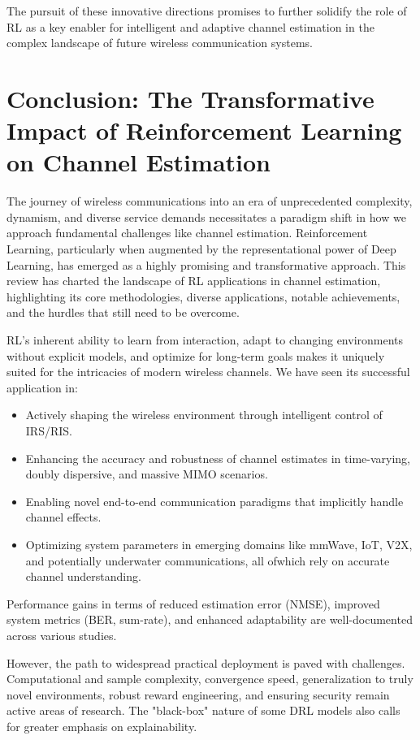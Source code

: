 \documentclass[journal,twocolumn]{IEEEtran}
\begin{document}
The pursuit of these innovative directions promises to further solidify the role of RL as a key enabler for intelligent and adaptive channel estimation in the complex landscape of future wireless communication systems.

\section{Conclusion: The Transformative Impact of Reinforcement Learning on Channel Estimation}
The journey of wireless communications into an era of unprecedented complexity, dynamism, and diverse service demands necessitates a paradigm shift in how we approach fundamental challenges like channel estimation. Reinforcement Learning, particularly when augmented by the representational power of Deep Learning, has emerged as a highly promising and transformative approach. This review has charted the landscape of RL applications in channel estimation, highlighting its core methodologies, diverse applications, notable achievements, and the hurdles that still need to be overcome.

RL's inherent ability to learn from interaction, adapt to changing environments without explicit models, and optimize for long-term goals makes it uniquely suited for the intricacies of modern wireless channels. We have seen its successful application in:
\begin{itemize}
    \item Actively shaping the wireless environment through intelligent control of IRS/RIS.
    \item Enhancing the accuracy and robustness of channel estimates in time-varying, doubly dispersive, and massive MIMO scenarios.
    \item Enabling novel end-to-end communication paradigms that implicitly handle channel effects.
    \item Optimizing system parameters in emerging domains like mmWave, IoT, V2X, and potentially underwater communications, all ofwhich rely on accurate channel understanding.
\end{itemize}
Performance gains in terms of reduced estimation error (NMSE), improved system metrics (BER, sum-rate), and enhanced adaptability are well-documented across various studies.

However, the path to widespread practical deployment is paved with challenges. Computational and sample complexity, convergence speed, generalization to truly novel environments, robust reward engineering, and ensuring security remain active areas of research. The "black-box" nature of some DRL models also calls for greater emphasis on explainability.
\end{document}
